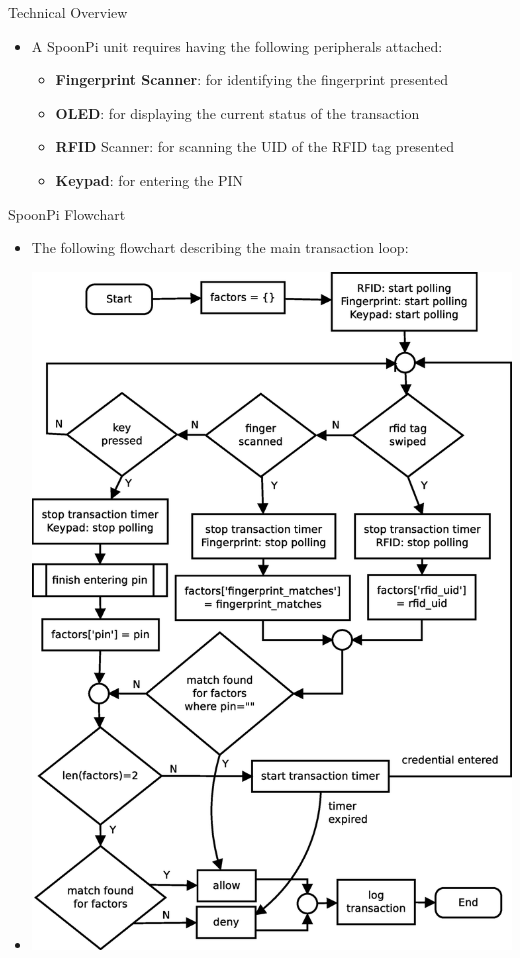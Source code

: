 \begin{frame}{Technical Overview}
\begin{itemize}
    \item<1-> A SpoonPi unit requires having the following peripherals attached:
    \begin{itemize}
    	\item<2-> \textbf{Fingerprint Scanner}: for identifying the fingerprint presented
		\item<3-> \textbf{OLED}: for displaying the current status of the transaction
		\item<4-> \textbf{RFID} Scanner: for scanning the UID of the RFID tag presented
		\item<5-> \textbf{Keypad}: for entering the PIN
    \end{itemize}
\end{itemize}
\end{frame}

\begin{frame}{SpoonPi Flowchart}
\begin{itemize}
    \item<1-> The following flowchart describing the main transaction loop:
    \item<2-> \includegraphics[scale=0.2]{spoonpi-flowchart.eps}
\end{itemize}
\end{frame}

